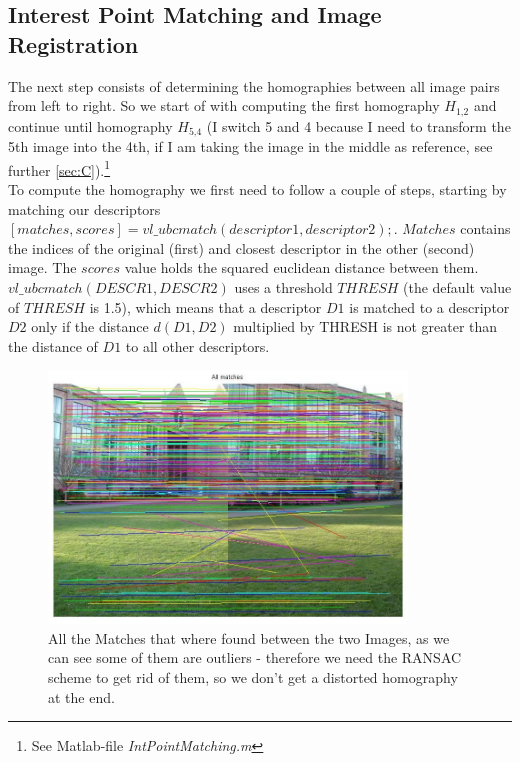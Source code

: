 \documentclass[subfigure,epsfig,fleqn,float,numbers=noenddot]{scrartcl}
\begin{document}
\subsection{Interest Point Matching and Image Registration}
\label{sec:B}
The next step consists of determining the homographies between all image pairs from left to right. So we start of with computing the first homography $H_\text{1,2}$ and continue until homography $H_\text{5,4}$ (I switch 5 and 4 because I need to transform the 5th image into the 4th, if I am taking the image in the middle as reference, see further \ref{sec:C}).\footnote{See Matlab-file \emph{IntPointMatching.m} } \\
To compute the homography we first need to follow a couple of steps, starting by matching our descriptors $[matches, scores] = vl\_ubcmatch(descriptor1, descriptor2);$. $Matches$ contains the indices of the original (first) and closest descriptor in the other (second) image. The $scores$ value holds the squared euclidean distance between them.  $vl\_ubcmatch(DESCR1, DESCR2)$ uses a threshold $THRESH$ (the default value of $THRESH$ is 1.5), which means that a descriptor $D1$ is matched to a descriptor $D2$ only if the distance $d(D1,D2)$ multiplied by THRESH is not greater than the distance of $D1$ to all other descriptors.\\
	\begin{figure}[H]
		\centering
		\includegraphics[width=0.85\textwidth]{./img/allMatches.jpg}
		\caption{All the Matches that where found between the two Images, as we can see some of them are outliers - therefore we need the RANSAC scheme to get rid of them, so we don't get a distorted homography at the end.}
		\label{img:outliers}
	\end{figure}
\end{document}
